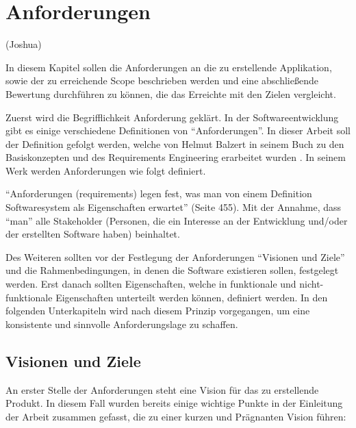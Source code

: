 \chapter{Anforderungen}

(Joshua)

In diesem Kapitel sollen die Anforderungen an die zu erstellende Applikation, sowie der zu erreichende Scope beschrieben werden und eine abschließende Bewertung durchführen zu können, die das Erreichte mit den Zielen vergleicht.

\vspace{0.25cm}

Zuerst wird die Begrifflichkeit Anforderung geklärt. In der Softwareentwicklung gibt es einige verschiedene Definitionen von \enquote{Anforderungen}. In dieser Arbeit soll der Definition gefolgt werden, welche von Helmut Balzert in seinem Buch zu den Basiskonzepten und des Requirements Engineering erarbeitet wurden \cite{Balzert.2009}. In seinem Werk werden Anforderungen wie folgt definiert.

\begin{defStrich}[Anforderungen]
	\enquote{Anforderungen (requirements) legen fest, was man von einem Definition
		Softwaresystem als Eigenschaften erwartet}\cite{Balzert.2009} (Seite 455). Mit der Annahme, dass \enquote{man} alle Stakeholder (Personen, die ein Interesse an der Entwicklung und/oder der erstellten Software haben) beinhaltet. \cite{Balzert.2009}
\end{defStrich} 

Des Weiteren sollten vor der Festlegung der Anforderungen \enquote{Visionen und Ziele} und die Rahmenbedingungen, in denen die Software existieren sollen, festgelegt werden. Erst danach sollten Eigenschaften, welche in funktionale und nicht-funktionale Eigenschaften unterteilt werden können, definiert werden. In den folgenden Unterkapiteln wird nach diesem Prinzip vorgegangen, um eine konsistente und sinnvolle Anforderungslage zu schaffen.

\section{Visionen und Ziele}
An erster Stelle der Anforderungen steht eine Vision für das zu erstellende Produkt. In diesem Fall wurden bereits einige wichtige Punkte in der Einleitung der Arbeit zusammen gefasst, die zu einer kurzen und Prägnanten Vision führen:

\vspace{0.25cm}

